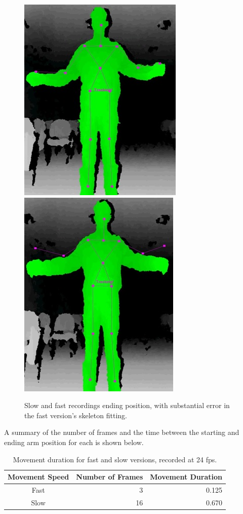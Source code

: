 \documentclass[10pt,a4paper]{article}
\begin{document}
\begin{figure}[H]
\center
\includegraphics[scale=0.5]{SlowEnd.jpg} \includegraphics[scale=0.4925]{FastEnd.jpg}
\caption{Slow and fast recordings ending position, with substantial error in the fast version's skeleton fitting.}
\end{figure}


\noindent A summary of the number of frames and the time between the starting and ending arm position for each  is shown below.

\begin{table}[H]
\center
\begin{tabular}{| c | r | r |}
\hline
Movement Speed & Number of Frames & Movement Duration\\
\hline
Fast & 3 & 0.125\\
Slow & 16 & 0.670\\
\hline
\end{tabular}
\caption{Movement duration for fast and slow versions, recorded at 24 fps.}
\end{table}
\end{document}
